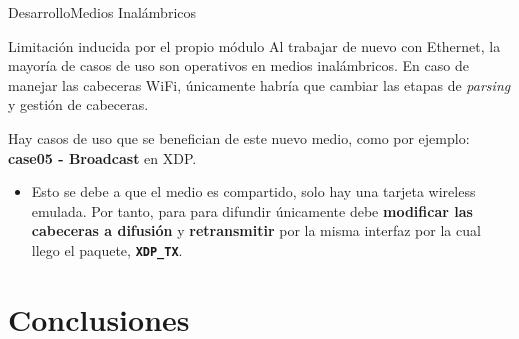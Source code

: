 \documentclass[10pt,compress,xcolor=table]{beamer} %
\begin{document}
\begin{frame}{Desarrollo}{Medios Inalámbricos}

\begin{block}{Limitación inducida por el propio módulo}
 Al trabajar de nuevo con Ethernet, la mayoría de casos de uso son operativos en medios inalámbricos. En caso de manejar las cabeceras WiFi, únicamente habría que cambiar las etapas de \textit{parsing} y gestión de cabeceras.
\end{block}
\vspace{0.2cm}
Hay casos de uso que se benefician de este nuevo medio, como por ejemplo: \textbf{case05 - Broadcast} en XDP.\vspace{0.2cm}
\begin{itemize}
    \item Esto se debe a que el medio es compartido, solo hay una tarjeta wireless emulada. Por tanto, para para difundir únicamente debe\textbf{ modificar las cabeceras a difusión} y \textbf{retransmitir} por la misma interfaz por la cual llego el paquete, \textbf{\texttt{XDP\_TX}}.\vspace{0.2cm}
\end{itemize}
\end{frame}

\section{Conclusiones}
\end{document}
